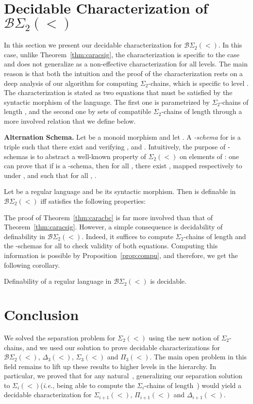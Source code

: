 \documentclass[envcountsame]{llncs}
\newcommand{\dew}[1]{\ensuremath{\Delta_{#1}(<)}\xspace}
\newcommand{\sic}[1]{\ensuremath{\Sigma_{#1}}\xspace}
\newcommand{\siw}[1]{\ensuremath{\Sigma_{#1}(<)}\xspace}
\newcommand{\piw}[1]{\ensuremath{\Pi_{#1}(<)}\xspace}
\newcommand{\siwd}{\ensuremath{\Sigma_{2}(<)}\xspace}
\newcommand{\bswd}{\ensuremath{\mathcal{B}\Sigma_{2}(<)}\xspace}
\newcommand{\dewt}{\ensuremath{\Delta_{3}(<)}\xspace}
\newcommand{\siwt}{\ensuremath{\Sigma_{3}(<)}\xspace}
\newcommand{\piwt}{\ensuremath{\Pi_{3}(<)}\xspace}
\newcommand{\siwi}{\ensuremath{\Sigma_{i}(<)}\xspace}
\newcommand\qchains[1]{\ensuremath{\sic{#1}}-chains\xspace}
\newcommand\ichains{\qchains{i}}
\newcommand\dchains{\qchains{2}}
\begin{document}
\section{Decidable Characterization of \bswd}
\label{sec:caracbc}
In this section we present our decidable characterization for
\bswd. In this case, unlike Theorem~\ref{thm:caracsig}, the
characterization is specific to the case  and does not generalize
as a non-effective characterization for all levels. The main reason is
that both the intuition and the proof of the characterization rests on
a deep analysis of our algorithm for computing \dchains, which is
specific to level . The characterization is stated as two
equations that must be satisfied by the syntactic morphism of the
language. The first one is parametrized by \dchains of length , and
the second one by sets of compatible \dchains of length  through a
more involved relation that we define below.

\medskip
\noindent
{\bf Alternation Schema.} Let  be a monoid
morphism and let . A \emph{-schema} for  is
a triple  such that there exist  and  verifying ,
 and . Intuitively, the purpose of
-schemas is to abstract a well-known property of \siwd on elements of
: one can prove that if  is a -schema, then for
all , there exist , mapped respectively to  under , and such that for all , . 


\begin{theorem} \label{thm:caracbc}
  Let  be a regular language and  be its
  syntactic morphism. Then  is definable in \bswd iff  satisfies the
  following properties:
  

  
\end{theorem}


The proof of Theorem~\ref{thm:caracbc} is far more involved than that
of Theorem~\ref{thm:caracsig}. However, a simple consequence is decidability of
definability in \bswd. Indeed, it suffices to compute \dchains of
length  and the -schemas for all  to check validity of both
equations. Computing this information is possible by
Proposition~\ref{prop:compu}, and therefore, we get the following
corollary.

\begin{corollary} \label{cor:decid2} Definability of a regular language in
  \bswd is decidable.
\end{corollary}





\section{Conclusion}
\label{sec:conc}
We solved the separation problem for \siwd using the new notion of \dchains,
and we used our solution to prove decidable characterizations for \bswd,
\dewt, \siwt and \piwt. The main open problem in this field remains to lift up
these results to higher levels in the hierarchy. In particular, we proved that
for any natural~, generalizing our separation solution to \siwi (\emph{i.e.}, being able
to compute the \ichains of length~) would yield a decidable
characterization for \siw{i+1}, \piw{i+1} and \dew{i+1}.
\end{document}
